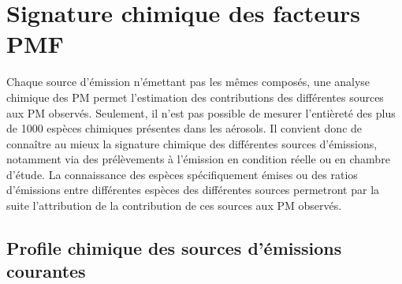 \section{Signature chimique des facteurs PMF}%
\label{sec:signature_chimique_des_facteurs_PMF}

Chaque source d'émission n'émettant pas les mêmes composés, une analyse chimique
des PM permet l'estimation des contributions des différentes sources aux PM observés.
Seulement, il n'est pas possible de mesurer l'entièreté des plus de 1000 espèces chimiques
présentes dans les aérosols.
Il convient donc de connaître au mieux la signature chimique des différentes sources
d'émissions, notamment via des prélèvements à l'émission en condition
réelle ou en chambre d'étude. La connaissance des espèces spécifiquement émises ou des
ratios d'émissions entre différentes espèces des différentes sources permetront par la
suite l'attribution de la contribution de ces sources aux PM observés.

\subsection{Profile chimique des sources d'émissions courantes}%
\label{sub:profile_chimique_des_sources_d_émissions_courantes}

